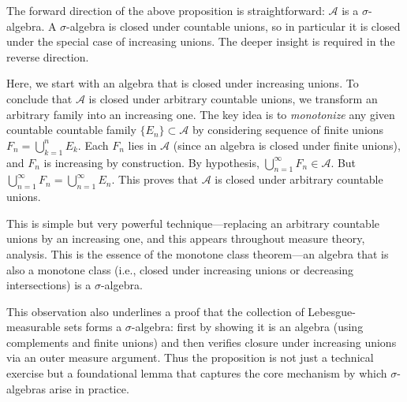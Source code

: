 \begin{interpretation}
The forward direction of the above proposition is straightforward: $\mathcal{A}$ is a $\sigma$-algebra. A $\sigma$-algebra is closed under countable unions, so in particular it is closed under the special case of increasing unions. The deeper insight is required in the reverse direction. 

 Here, we start with an algebra that is closed under increasing unions. To conclude that $\mathcal{A}$ is closed under arbitrary countable unions, we transform an arbitrary family into an increasing one. The key idea is to \emph{monotonize} any given countable countable family $\{E_n\}\subset\mathcal{A}$ by considering sequence of finite unions $F_n=\bigcup_{k=1}^n E_k$. Each $F_n$ lies in $\mathcal{A}$ (since an algebra is closed under finite unions), and $F_n$ is increasing by construction. By hypothesis, $\bigcup_{n=1}^\infty F_n\in\mathcal{A}$. But $\bigcup_{n=1}^\infty F_n=\bigcup_{n=1}^\infty E_n$. This proves that $\mathcal{A}$ is closed under arbitrary countable unions.
 
 This is simple but very powerful technique---replacing an arbitrary countable unions by an increasing one, and this appears throughout measure theory, analysis. This is the essence of the monotone class theorem---an algebra that is also a monotone class (i.e., closed under increasing unions or decreasing intersections) is a $\sigma$-algebra.

 
This observation also underlines a proof that the collection of Lebesgue-measurable sets forms a $\sigma$-algebra: first by showing it is an algebra (using complements and finite unions) and then verifies closure under increasing unions via an outer measure argument. Thus the proposition is not just a technical exercise but a foundational lemma that captures the core mechanism by which $\sigma$-algebras arise in practice. 
\end{interpretation}


